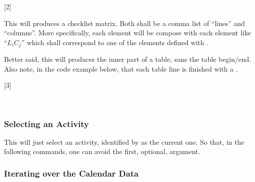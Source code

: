 \documentclass[10pt]{article}
\begin{document}
[2]


\begin{codedescribe}{\StudentCheckListTable}
\begin{codesyntax}
\end{codesyntax}
  This will produces a checklist matrix. Both  shall be a comma list of ``lines'' and ``columns''. More specifically, each  element will be compose with each  element like ``$L_iC_j$'' which shall correspond to one of the  elements defined with \tsobj{\checkdef}.
\end{codedescribe}
\begin{tsremark}
  Better said, this will produces the inner part of a table, sans the table begin/end. Also note, in the code example below, that each table line is finished with a \tsobj[verb]{\\*}.
\end{tsremark}

[3]




~

\subsubsection{Selecting an Activity}

\begin{codedescribe}{\ActivitySelect}
  \begin{codesyntax}
  \end{codesyntax}
  This will just select an activity, identified by  as the current one. So that, in the following commands, one can avoid the first, optional, argument.
\end{codedescribe}





\subsubsection{Iterating over the Calendar Data}
\end{document}
